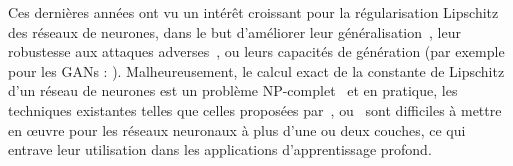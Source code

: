%

Ces dernières années ont vu un intérêt croissant pour la régularisation Lipschitz des réseaux de neurones, dans le but d'améliorer leur généralisation~\cite{bartlett2017spectrally}, leur robustesse aux attaques adverses~\cite{tsuzuku2018lipschitz, farnia2018generalizable}, ou leurs capacités de génération (par exemple pour les GANs : \citet{miyato2018spectral,arjovsky2017wasserstein}).
Malheureusement, le calcul exact de la constante de Lipschitz d'un réseau de neurones est un problème NP-complet~\cite{scaman2018lipschitz} et en pratique, les techniques existantes telles que celles proposées par~\citet{scaman2018lipschitz}, \citet{fazlyab2019efficient} ou~\citet{latorre2020lipschitz} sont difficiles à mettre en œuvre pour les réseaux neuronaux à plus d'une ou deux couches, ce qui entrave leur utilisation dans les applications d'apprentissage profond.

